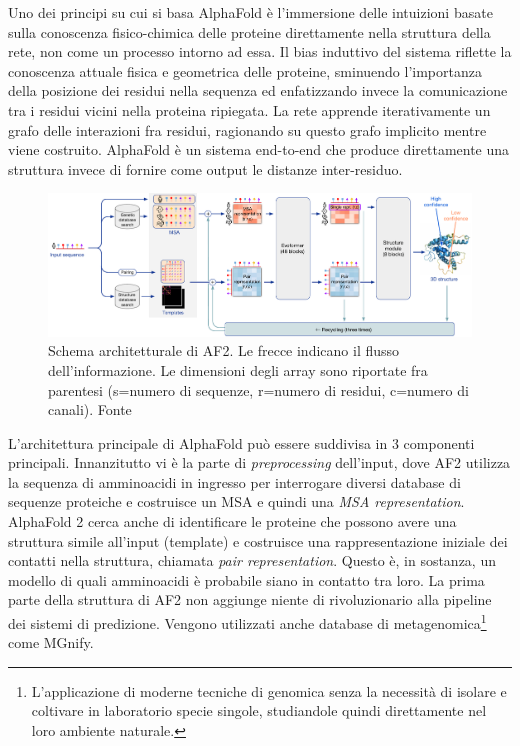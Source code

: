 \par Uno dei principi su cui si basa AlphaFold è l'immersione delle intuizioni basate sulla conoscenza fisico-chimica delle proteine direttamente nella struttura della rete, non come un processo intorno ad essa. Il bias induttivo del sistema riflette la conoscenza attuale fisica e geometrica delle proteine, sminuendo l'importanza della posizione dei residui nella sequenza ed enfatizzando invece la comunicazione tra i residui vicini nella proteina ripiegata. La rete apprende iterativamente un grafo delle interazioni fra residui, ragionando su questo grafo implicito mentre viene costruito. AlphaFold è un sistema end-to-end che produce direttamente una struttura invece di fornire come output le distanze inter-residuo.

\begin{figure}[!htb]
	\centering
	\includegraphics[scale=0.38]{images/af-archit.png}
	\caption{Schema architetturale di AF2. Le frecce indicano il flusso dell'informazione. Le dimensioni degli array sono riportate fra parentesi (s=numero di sequenze, r=numero di residui, c=numero di canali). Fonte\cite{jumper2021highly}}
	\label{fig:architettura-af2}
\end{figure}

L'architettura principale di AlphaFold può essere suddivisa in 3 componenti principali. Innanzitutto vi è la parte di \textit{preprocessing} dell'input, dove AF2 utilizza la sequenza di amminoacidi in ingresso per interrogare diversi database di sequenze proteiche e costruisce un MSA e quindi una \textit{MSA representation}. AlphaFold 2 cerca anche di identificare le proteine che possono avere una struttura simile all'input (template) e costruisce una rappresentazione iniziale dei contatti nella struttura, chiamata \textit{pair representation}. Questo è, in sostanza, un modello di quali amminoacidi è probabile siano in contatto tra loro. La prima parte della struttura di AF2 non aggiunge niente di rivoluzionario alla pipeline dei sistemi di predizione. Vengono utilizzati anche database di metagenomica\footnote{L'applicazione di moderne tecniche di genomica senza la necessità di isolare e coltivare in laboratorio specie singole, studiandole quindi direttamente nel loro ambiente naturale.} come MGnify.

